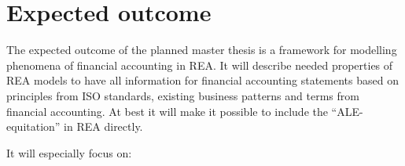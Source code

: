 









\section*{Expected outcome}

The expected outcome of the planned master thesis is a framework for modelling phenomena of financial accounting in REA.
It will describe needed properties of REA models to have all information for financial accounting statements based on principles from ISO standards, existing business patterns and terms from financial accounting.
At best it will make it possible to include the ``ALE-equitation'' in REA directly.

It will especially focus on:

